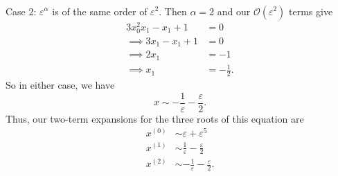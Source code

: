 \documentclass{article}
\begin{document}
\begin{itemize}
\begin{itemize}
\begin{align*}
        \end{align*}
        Case 2: $\varepsilon^{\alpha}$ is of the same order of $\varepsilon^2$. Then $\alpha = 2$ and our $\mathcal{O}(\varepsilon^2)$ terms give
        \begin{align*}
            3x_0^2x_1 - x_1 + 1 &= 0\\
            \implies 3x_1 - x_1 + 1 &= 0\\
            \implies 2x_1 &= -1\\
            \implies x_1 &= -\frac{1}{2}.
        \end{align*}
        So in either case, we have 
        \[x \sim -\frac{1}{\varepsilon} - \frac{\varepsilon}{2}.\]
        Thus, our two-term expansions for the three roots of this equation are
        \begin{align*}
            x^{(0)} &\sim \varepsilon + \varepsilon^5\\
            x^{(1)} &\sim \frac{1}{\varepsilon} - \frac{\varepsilon}{2}\\
            x^{(2)} &\sim -\frac{1}{\varepsilon} - \frac{\varepsilon}{2}.
        \end{align*}
        

\end{itemize}
\end{itemize}
\end{document}
